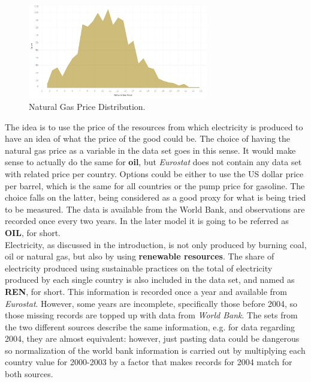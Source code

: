 \documentclass{book}
\begin{document}
\bigskip
\begin{figure}[H]
\begin{center}
\captionsetup{justification=centering}
\includegraphics[width=0.7\textwidth]{Images/nGas.png}
\caption{Natural Gas Price Distribution.}
\end{center}
\end{figure}
\bigskip

The idea is to use the price of the resources from which electricity is produced to have an idea of what the price of the good could be. The choice of having the natural gas price as a variable in the data set goes in this sense. It would make sense to actually do the same for \textbf{oil}, but \textit{Eurostat} does not contain any data set with related price per country. Options could be either to use the US dollar price per barrel, which is the same for all countries or the pump price for gasoline. The choice falls on the latter, being considered as a good proxy for what is being tried to be measured. The data is available from the World Bank, and observations are recorded once every two years. In the later model it is going to be referred as \textbf{OIL}, for short.\\

Electricity, as discussed in the introduction, is not only produced by burning coal, oil or natural gas, but also by using \textbf{renewable resources}. The share of electricity produced using sustainable practices on the total of electricity produced by each single country is also included in the data set, and named as \textbf{REN}, for short. This information is recorded once a year and available from \textit{Eurostat}. However, some years are incomplete, specifically those before 2004, so those missing records are topped up with data from \textit{World Bank}. The sets from the two different sources describe the same information, e.g. for data regarding 2004, they are almost equivalent: however, just pasting data could be dangerous so normalization of the world bank information is carried out by multiplying each country value for 2000-2003 by a factor that makes records for 2004 match for both sources. \\
\end{document}
